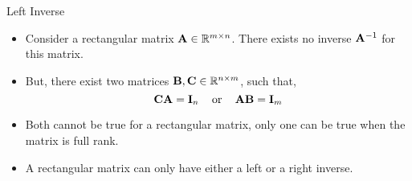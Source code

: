 \documentclass[aspectratio=169]{beamer}
\let\olditem\item
\renewcommand{\item}{\setlength{\itemsep}{\fill}\olditem}
\def\mf{\ensuremath\mathbf}
\def\mb{\ensuremath\mathbb}
\newcommand{\demoex}[2]{\onslide<#1->\begin{color}{black!60} #2 \end{color}}
\begin{document}







\begin{frame}[t]{Left Inverse}
\begin{itemize}
    \item Consider a rectangular matrix $\mf{A} \in \mb{R}^{m \times n}$. There exists no inverse $\mf{A}^{-1}$ for this matrix.

    \item But, there exist two matrices $\mf{B}, \mf{C} \in \mb{R}^{n \times m}$, such that,
    \[ \mf{CA} = \mf{I}_n \,\,\,\,\, \text{ or } \,\,\,\,\, \mf{AB} = \mf{I}_m \]

    \item Both cannot be true for a rectangular matrix, only one can be true when the matrix is full rank.

    \item A rectangular matrix can only have either a left or a right inverse.

\end{itemize}
\end{frame}
\end{document}

